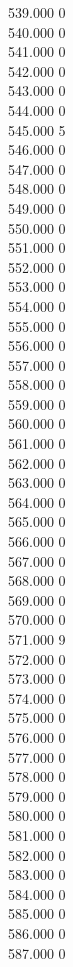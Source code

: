 { 539.000	0 \\
 540.000	0 \\
 541.000	0 \\
 542.000	0 \\
 543.000	0 \\
 544.000	0 \\
 545.000	5 \\
 546.000	0 \\
 547.000	0 \\
 548.000	0 \\
 549.000	0 \\
 550.000	0 \\
 551.000	0 \\
 552.000	0 \\
 553.000	0 \\
 554.000	0 \\
 555.000	0 \\
 556.000	0 \\
 557.000	0 \\
 558.000	0 \\
 559.000	0 \\
 560.000	0 \\
 561.000	0 \\
 562.000	0 \\
 563.000	0 \\
 564.000	0 \\
 565.000	0 \\
 566.000	0 \\
 567.000	0 \\
 568.000	0 \\
 569.000	0 \\
 570.000	0 \\
 571.000	9 \\
 572.000	0 \\
 573.000	0 \\
 574.000	0 \\
 575.000	0 \\
 576.000	0 \\
 577.000	0 \\
 578.000	0 \\
 579.000	0 \\
 580.000	0 \\
 581.000	0 \\
 582.000	0 \\
 583.000	0 \\
 584.000	0 \\
 585.000	0 \\
 586.000	0 \\
 587.000	0 \\
}

